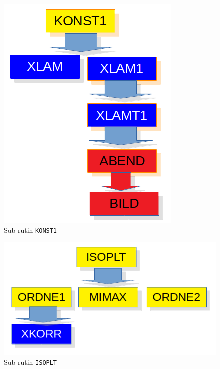 \documentclass[a4paper,11pt]{report}
\begin{document}
\begin{figure}[h!]
  \begin{center}
    \includegraphics[scale=.5]{../konst1.png}
    \caption{Sub rutin \texttt{KONST1}}
    \label{fig:konst1}
  \end{center}
\end{figure}

\begin{figure}[h!]
  \begin{center}
    \includegraphics[scale=.5]{../isoplt.png}
    \caption{Sub rutin \texttt{ISOPLT}}
    \label{fig:isoplt}
  \end{center}
\end{figure}
\end{document}

